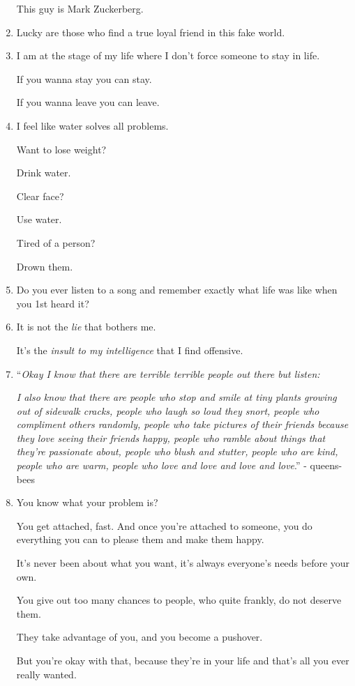 \documentclass{article}
\begin{document}
\begin{enumerate}
	This guy is Mark Zuckerberg.
	\item Lucky are those who find a true loyal friend in this fake world.
	\item I am at the stage of my life where I don't force someone to stay in life.
	
	If you wanna stay you can stay.
	
	If you wanna leave you can leave.
	\item I feel like water solves all problems.
	
	Want to lose weight?
	
	Drink water.
	
	Clear face?
	
	Use water.
	
	Tired of a person?
	
	Drown them.
	\item Do you ever listen to a song and remember exactly what life was like when you 1st heard it?
	\item It is not the \textit{lie} that bothers me.
	
	It's the \textit{insult to my intelligence} that I find offensive.
	\item ``\textit{Okay I know that there are terrible terrible people out there but listen:}
	
	\textit{I also know that there are people who stop and smile at tiny plants growing out of sidewalk cracks, people who laugh so loud they snort, people who compliment others randomly, people who take pictures of their friends because they love seeing their friends happy, people who ramble about things that they're passionate about, people who blush and stutter, people who are kind, people who are warm, people who love and love and love and love}.'' - queens-bees
	\item You know what your problem is?
	
	You get attached, fast.
	And once you're attached to someone, you do everything you can to please them and make them happy.
	
	It's never been about what you want, it's always everyone's needs before your own.
	
	You give out too many chances to people, who quite frankly, do not deserve them.
	
	They take advantage of you, and you become a pushover.
	
	But you're okay with that, because they're in your life and that's all you ever really wanted.
	

\end{enumerate}
\end{document}
